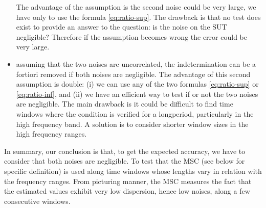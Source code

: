 \begin{itemize}
The advantage of the  assumption is the second noise could be very large, we have only to use the formula \eqref{eq:ratio-sup}. The drawback is that no test does exist to provide an answer to the question: is the noise on the SUT negligible? Therefore if the assumption becomes wrong the error could be very large.

\item
assuming that the two noises are uncorrelated, the indetermination can be a fortiori removed if both noises are negligible. The advantage of this second assumption is double: (i) we can use any of the two formulas \eqref{eq:ratio-sup} or \eqref{eq:ratio-inf}, and (ii) we have an efficient way to test if or not the two noises are negligible. The main drawback is it could be difficult to find time windows where the condition is verified for a longperiod, particularly in the high frequency band. A solution is to consider shorter window sizes in the high frequency ranges. 



\end{itemize}

In summary, our conclusion is that, to get the expected accuracy, we have to consider that both noises are negligible. To test that the MSC (see below for specific definition) is used along time windows whose lengths vary in relation with the frequency ranges. From picturing manner, the MSC measures the fact that the estimated values exhibit very low dispersion, hence low noises, along a few consecutive windows. 
 
